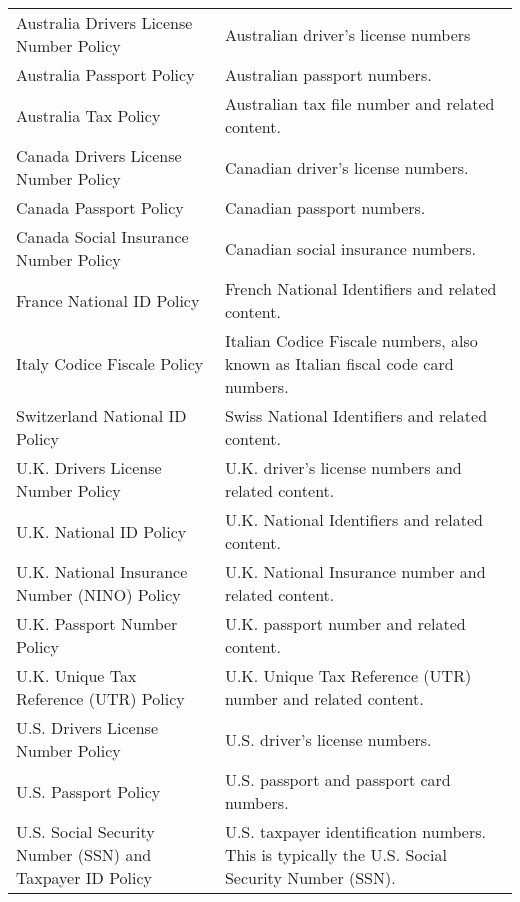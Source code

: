 \documentclass[letterpaper,10pt,english]{sphinxmanual}
\begin{document}
\begin{savenotes}\sphinxattablestart
\centering
\begin{tabulary}{\linewidth}[t]{|T|T|}
\hline
{}\relax &\relax \\
\hline
Australia Drivers License Number Policy
&
Australian driver’s license numbers
\\
\hline
Australia Passport Policy
&
Australian passport numbers.
\\
\hline
Australia Tax Policy
&
Australian tax file number and related content.
\\
\hline
Canada Drivers License Number Policy
&
Canadian driver’s license numbers.
\\
\hline
Canada Passport Policy
&
Canadian passport numbers.
\\
\hline
Canada Social Insurance Number Policy
&
Canadian social insurance numbers.
\\
\hline
France National ID Policy
&
French National Identifiers and related content.
\\
\hline
Italy Codice Fiscale Policy
&
Italian Codice Fiscale numbers, also known as Italian fiscal
code card numbers.
\\
\hline
Switzerland National ID Policy
&
Swiss National Identifiers and related content.
\\
\hline
U.K. Drivers License Number Policy
&
U.K. driver’s license numbers and related content.
\\
\hline
U.K. National ID Policy
&
U.K. National Identifiers and related content.
\\
\hline
U.K. National Insurance Number (NINO)
Policy
&
U.K. National Insurance number and related content.
\\
\hline
U.K. Passport Number Policy
&
U.K. passport number and related content.
\\
\hline
U.K. Unique Tax Reference (UTR) Policy
&
U.K. Unique Tax Reference (UTR) number and related content.
\\
\hline
U.S. Drivers License Number Policy
&
U.S. driver’s license numbers.
\\
\hline
U.S. Passport Policy
&
U.S. passport and passport card numbers.
\\
\hline
U.S. Social Security Number (SSN) and
Taxpayer ID Policy
&
U.S. taxpayer identification numbers. This is typically
the U.S. Social Security Number (SSN).
\\
\hline
\end{tabulary}
\par
\sphinxattableend\end{savenotes}
\end{document}
